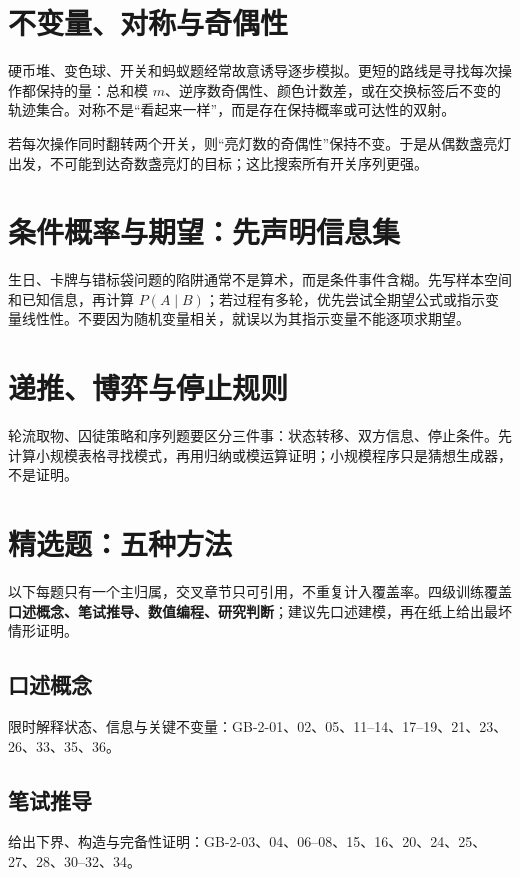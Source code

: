 \section{不变量、对称与奇偶性}

硬币堆、变色球、开关和蚂蚁题经常故意诱导逐步模拟。更短的路线是寻找每次操作都保持的量：总和模 $m$、逆序数奇偶性、颜色计数差，或在交换标签后不变的轨迹集合。对称不是“看起来一样”，而是存在保持概率或可达性的双射。

\begin{example}
若每次操作同时翻转两个开关，则“亮灯数的奇偶性”保持不变。于是从偶数盏亮灯出发，不可能到达奇数盏亮灯的目标；这比搜索所有开关序列更强。
\end{example}

\section{条件概率与期望：先声明信息集}

生日、卡牌与错标袋问题的陷阱通常不是算术，而是条件事件含糊。先写样本空间和已知信息，再计算 $P(A\mid B)$；若过程有多轮，优先尝试全期望公式或指示变量线性性。不要因为随机变量相关，就误以为其指示变量不能逐项求期望。

\section{递推、博弈与停止规则}

轮流取物、囚徒策略和序列题要区分三件事：状态转移、双方信息、停止条件。先计算小规模表格寻找模式，再用归纳或模运算证明；小规模程序只是猜想生成器，不是证明。

\section{精选题：五种方法}

以下每题只有一个主归属，交叉章节只可引用，不重复计入覆盖率。四级训练覆盖\textbf{口述概念、笔试推导、数值编程、研究判断}；建议先口述建模，再在纸上给出最坏情形证明。

\subsection*{口述概念}
限时解释状态、信息与关键不变量：GB-2-01、02、05、11--14、17--19、21、23、26、33、35、36。

\subsection*{笔试推导}
给出下界、构造与完备性证明：GB-2-03、04、06--08、15、16、20、24、25、27、28、30--32、34。

